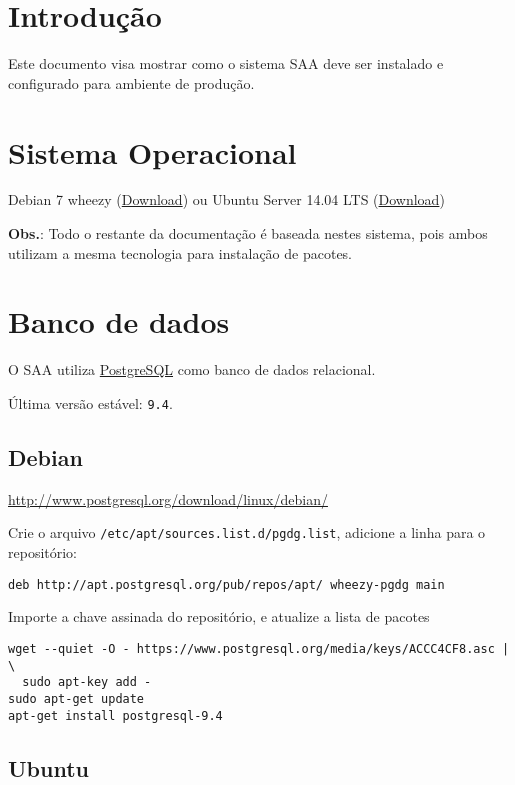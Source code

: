 \section{Introdução}\label{introduuxe7uxe3o}

Este documento visa mostrar como o sistema SAA deve ser instalado e
configurado para ambiente de produção.

\section{Sistema Operacional}\label{sistema-operacional}

Debian 7 wheezy (\href{http://debian.c3sl.ufpr.br/debian-cd/}{Download})
ou Ubuntu Server 14.04 LTS
(\href{http://www.ubuntu.com/download/server}{Download})

\textbf{Obs.}: Todo o restante da documentação é baseada nestes sistema,
pois ambos utilizam a mesma tecnologia para instalação de pacotes.

\section{Banco de dados}\label{banco-de-dados}

O SAA utiliza \href{http://www.postgresql.org/}{PostgreSQL} como banco
de dados relacional.

Última versão estável: \texttt{9.4}.

\subsection{Debian}\label{debian}

\url{http://www.postgresql.org/download/linux/debian/}

Crie o arquivo \texttt{/etc/apt/sources.list.d/pgdg.list}, adicione a
linha para o repositório:

\begin{verbatim}
deb http://apt.postgresql.org/pub/repos/apt/ wheezy-pgdg main
\end{verbatim}

Importe a chave assinada do repositório, e atualize a lista de pacotes

\begin{verbatim}
wget --quiet -O - https://www.postgresql.org/media/keys/ACCC4CF8.asc | \
  sudo apt-key add -
sudo apt-get update
apt-get install postgresql-9.4
\end{verbatim}

\subsection{Ubuntu}\label{ubuntu}

